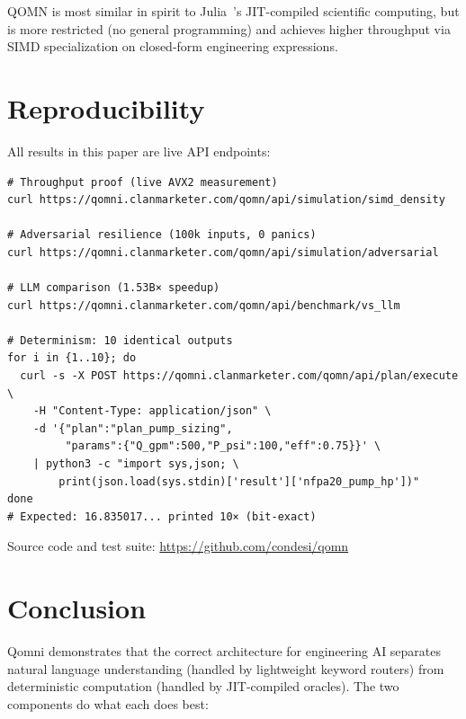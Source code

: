 \documentclass[11pt]{article}
\begin{document}
QOMN is most similar in spirit to Julia~\cite{bezanson2017julia}'s JIT-compiled
scientific computing, but is more restricted (no general programming) and achieves
higher throughput via SIMD specialization on closed-form engineering expressions.

\section{Reproducibility}

All results in this paper are live API endpoints:

\begin{lstlisting}[caption={Reproduce benchmark results}]
# Throughput proof (live AVX2 measurement)
curl https://qomni.clanmarketer.com/qomn/api/simulation/simd_density

# Adversarial resilience (100k inputs, 0 panics)
curl https://qomni.clanmarketer.com/qomn/api/simulation/adversarial

# LLM comparison (1.53B× speedup)
curl https://qomni.clanmarketer.com/qomn/api/benchmark/vs_llm

# Determinism: 10 identical outputs
for i in {1..10}; do
  curl -s -X POST https://qomni.clanmarketer.com/qomn/api/plan/execute \
    -H "Content-Type: application/json" \
    -d '{"plan":"plan_pump_sizing",
         "params":{"Q_gpm":500,"P_psi":100,"eff":0.75}}' \
    | python3 -c "import sys,json; \
        print(json.load(sys.stdin)['result']['nfpa20_pump_hp'])"
done
# Expected: 16.835017... printed 10× (bit-exact)
\end{lstlisting}

Source code and test suite: \url{https://github.com/condesi/qomn}

\section{Conclusion}

Qomni demonstrates that the correct architecture for engineering AI separates
natural language understanding (handled by lightweight keyword routers) from
deterministic computation (handled by JIT-compiled oracles). The two components
do what each does best:
\end{document}
